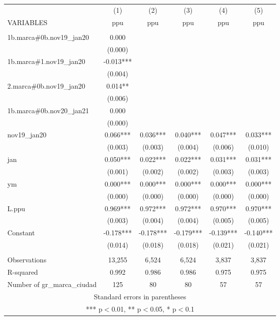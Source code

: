 \begin{tabular}{lccccc} \hline
 & (1) & (2) & (3) & (4) & (5) \\
VARIABLES & ppu & ppu & ppu & ppu & ppu \\ \hline
 &  &  &  &  &  \\
1b.marca\#0b.nov19\_jan20 & 0.000 &  &  &  &  \\
 & (0.000) &  &  &  &  \\
1b.marca\#1.nov19\_jan20 & -0.013*** &  &  &  &  \\
 & (0.004) &  &  &  &  \\
2.marca\#0b.nov19\_jan20 & 0.014** &  &  &  &  \\
 & (0.006) &  &  &  &  \\
1b.marca\#0b.nov20\_jan21 & 0.000 &  &  &  &  \\
 & (0.000) &  &  &  &  \\
nov19\_jan20 & 0.066*** & 0.036*** & 0.040*** & 0.047*** & 0.033*** \\
 & (0.003) & (0.003) & (0.004) & (0.006) & (0.010) \\
jan & 0.050*** & 0.022*** & 0.022*** & 0.031*** & 0.031*** \\
 & (0.001) & (0.002) & (0.002) & (0.003) & (0.003) \\
ym & 0.000*** & 0.000*** & 0.000*** & 0.000*** & 0.000*** \\
 & (0.000) & (0.000) & (0.000) & (0.000) & (0.000) \\
L.ppu & 0.969*** & 0.972*** & 0.972*** & 0.970*** & 0.970*** \\
 & (0.003) & (0.004) & (0.004) & (0.005) & (0.005) \\
Constant & -0.178*** & -0.178*** & -0.179*** & -0.139*** & -0.140*** \\
 & (0.014) & (0.018) & (0.018) & (0.021) & (0.021) \\
 &  &  &  &  &  \\
Observations & 13,255 & 6,524 & 6,524 & 3,837 & 3,837 \\
R-squared & 0.992 & 0.986 & 0.986 & 0.975 & 0.975 \\
 Number of gr\_marca\_ciudad & 125 & 80 & 80 & 57 & 57 \\ \hline
\multicolumn{6}{c}{ Standard errors in parentheses} \\
\multicolumn{6}{c}{ *** p$<$0.01, ** p$<$0.05, * p$<$0.1} \\
\end{tabular}
